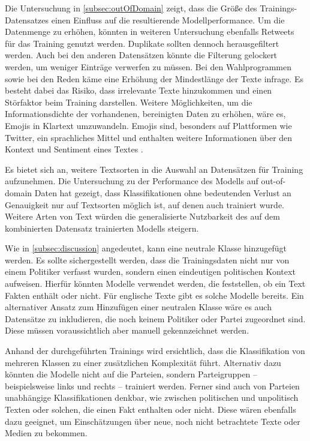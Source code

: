 Die Untersuchung in \autoref{subsec:outOfDomain} zeigt, dass die Größe des Trainings-Datensatzes einen Einfluss auf die resultierende Modellperformance. Um die Datenmenge zu erhöhen, könnten in weiteren Untersuchung ebenfalls Retweets für das Training genutzt werden. Duplikate sollten dennoch herausgefiltert werden. Auch bei den anderen Datensätzen könnte die Filterung gelockert werden, um weniger Einträge verwerfen zu müssen. Bei den Wahlprogrammen sowie bei den Reden käme eine Erhöhung der Mindestlänge der Texte infrage. Es besteht dabei das Risiko, dass irrelevante Texte hinzukommen und einen Störfaktor beim Training darstellen. Weitere Möglichkeiten, um die Informationsdichte der vorhandenen, bereinigten Daten zu erhöhen, wäre es, Emojis in Klartext umzuwandeln. Emojis sind, besonders auf Plattformen wie Twitter, ein sprachliches Mittel und enthalten weitere Informationen über den Kontext und Sentiment eines Textes \autocite{guhr_training_2020}.

Es bietet sich an, weitere Textsorten in die Auswahl an Datensätzen für Training aufzunehmen. Die Untersuchung zu der Performance des \ft Modells auf out-of-domain Daten hat gezeigt, dass Klassifikationen ohne bedeutenden Verlust an Genauigkeit nur auf Textsorten möglich ist, auf denen auch trainiert wurde. Weitere Arten von Text würden die generalisierte Nutzbarkeit des auf dem kombinierten Datensatz trainierten Modells steigern.

Wie in \autoref{subsec:discussion} angedeutet, kann eine neutrale Klasse hinzugefügt werden. Es sollte sichergestellt werden, dass die Trainingsdaten nicht nur von einem Politiker verfasst wurden, sondern einen eindeutigen politischen Kontext aufweisen. Hierfür könnten Modelle verwendet werden, die feststellen, ob ein Text Fakten enthält oder nicht. Für englische Texte gibt es solche Modelle bereits. Ein alternativer Ansatz zum Hinzufügen einer neutralen Klasse wäre es auch Datensätze zu inkludieren, die noch keinem Politiker oder Partei zugeordnet sind. Diese müssen voraussichtlich aber manuell gekennzeichnet werden.

Anhand der durchgeführten Trainings wird ersichtlich, dass die Klassifikation von mehreren Klassen zu einer zusätzlichen Komplexität führt. Alternativ dazu könnten die Modelle nicht auf die Parteien, sondern Parteigruppen -- beispielsweise links und rechts -- trainiert werden. Ferner sind auch von Parteien unabhängige Klassifikationen denkbar, wie zwischen politischen und unpolitisch Texten oder solchen, die einen Fakt enthalten oder nicht. Diese wären ebenfalls dazu geeignet, um Einschätzungen über neue, noch nicht betrachtete Texte oder Medien zu bekommen.

